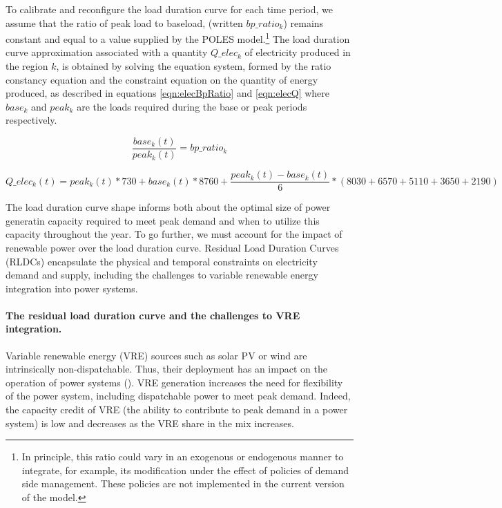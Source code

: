 To calibrate and reconfigure the load duration curve for each time period, we assume that the ratio of peak load to baseload, (written $bp\_ratio_k$) remains constant and equal to a value supplied by the POLES model.\footnote{
    In principle, this ratio could vary in an exogenous or endogenous manner to integrate, for example, its modification under the effect of policies of demand side management. These policies are not implemented in the current version of the model.
}
The load duration curve approximation associated with a quantity $Q\_elec_k$ of electricity produced in the region $k$, is obtained by solving the equation system, formed by the ratio constancy equation and the constraint equation on the quantity of energy produced, as described in equations \ref{eqn:elecBpRatio} and  \ref{eqn:elecQ}
where $base_k$ and $peak_k$ are the loads required during the base or peak periods respectively.

\begin{dmath}
    \frac{base_k(t)}{peak_k(t)} = bp\_ratio_k
    \label{eqn:elecBpRatio}
\end{dmath}

\begin{dmath}
    Q\_elec_k(t) =
    peak_k(t) * 730 +
    base_k(t) * 8760 + \frac{peak_k(t) - base_k(t)}{6} * ( 8030 + 6570 + 5110 + 3650 + 2190)
    \label{eqn:elecQ}
\end{dmath}

The load duration curve shape informs both about the optimal size of power generatin capacity required to meet peak demand and when to utilize this capacity throughout the year. To go further, we must account for the impact of renewable power over the load duration curve. Residual Load Duration Curves (RLDCs) encapsulate the physical and temporal constraints on electricity demand and supply, including the challenges to variable renewable energy integration into power systems.

\paragraph{The residual load duration curve and the challenges to VRE integration.}

Variable renewable energy (VRE) sources such as solar PV or wind are intrinsically non-dispatchable. Thus, their deployment has an impact on the operation of power systems (\cite{Hirth2015}). VRE generation increases the need for flexibility of the power system, including dispatchable power to meet peak demand. Indeed, the capacity credit of VRE (the ability to contribute to peak demand in a power system) is low and decreases as the VRE share in the mix increases.

